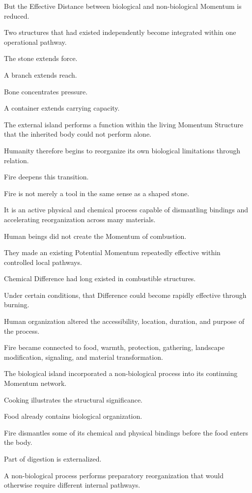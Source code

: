 But the Effective Distance between biological and non-biological Momentum is reduced.

Two structures that had existed independently become integrated within one operational pathway.

The stone extends force.

A branch extends reach.

Bone concentrates pressure.

A container extends carrying capacity.

The external island performs a function within the living Momentum Structure that the inherited body could not perform alone.

Humanity therefore begins to reorganize its own biological limitations through relation.

Fire deepens this transition.

Fire is not merely a tool in the same sense as a shaped stone.

It is an active physical and chemical process capable of dismantling bindings and accelerating reorganization across many materials.

Human beings did not create the Momentum of combustion.

They made an existing Potential Momentum repeatedly effective within controlled local pathways.

Chemical Difference had long existed in combustible structures.

Under certain conditions, that Difference could become rapidly effective through burning.

Human organization altered the accessibility, location, duration, and purpose of the process.

Fire became connected to food, warmth, protection, gathering, landscape modification, signaling, and material transformation.

The biological island incorporated a non-biological process into its continuing Momentum network.

Cooking illustrates the structural significance.

Food already contains biological organization.

Fire dismantles some of its chemical and physical bindings before the food enters the body.

Part of digestion is externalized.

A non-biological process performs preparatory reorganization that would otherwise require different internal pathways.

